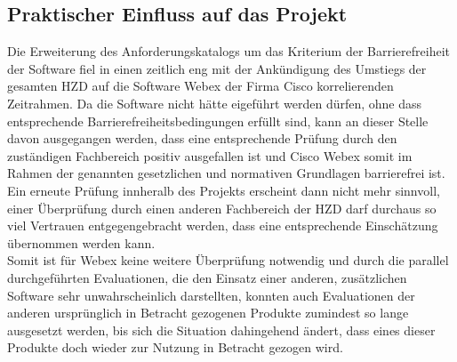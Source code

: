 \documentclass[ThesisDJ.tex]{subfiles}
\begin{document}
\subsection{Praktischer Einfluss auf das Projekt}
Die Erweiterung des Anforderungskatalogs um das Kriterium der Barrierefreiheit der Software fiel in einen zeitlich eng mit der Ankündigung des Umstiegs der gesamten HZD auf die Software Webex der Firma Cisco korrelierenden Zeitrahmen. Da die Software nicht hätte eigeführt werden dürfen, ohne dass entsprechende Barrierefreiheitsbedingungen erfüllt sind, kann an dieser Stelle davon ausgegangen werden, dass eine entsprechende Prüfung durch den zuständigen Fachbereich positiv ausgefallen ist und Cisco Webex somit im Rahmen der genannten gesetzlichen und normativen Grundlagen barrierefrei ist. Ein erneute Prüfung innheralb des Projekts erscheint dann nicht mehr sinnvoll, einer Überprüfung durch einen anderen Fachbereich der HZD darf durchaus so viel Vertrauen entgegengebracht werden, dass eine entsprechende Einschätzung übernommen werden kann.\\
Somit ist für Webex keine weitere Überprüfung notwendig und durch die parallel durchgeführten Evaluationen, die den Einsatz einer anderen, zusätzlichen Software sehr unwahrscheinlich darstellten, konnten auch Evaluationen der anderen ursprünglich in Betracht gezogenen Produkte zumindest so lange ausgesetzt werden, bis sich die Situation dahingehend ändert, dass eines dieser Produkte doch wieder zur Nutzung in Betracht gezogen wird.
\end{document}
